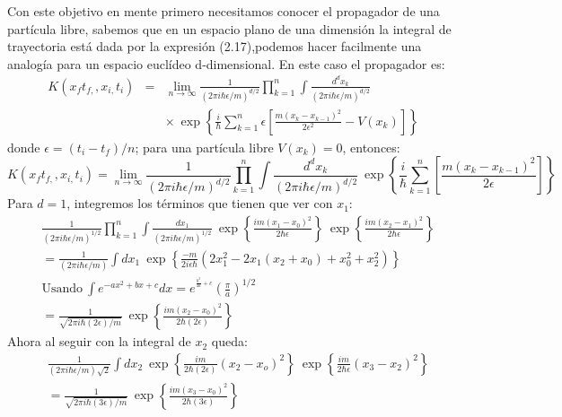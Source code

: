 Con este objetivo en mente primero necesitamos conocer el propagador de una partícula libre, sabemos que en un espacio plano de una dimensión la integral de trayectoria está dada por la expresión (2.17),podemos hacer facilmente una analogía para un espacio euclídeo d-dimensional. En este caso el propagador es:
\begin{eqnarray}
\nonumber K(x_{f}t_{f,},x_{i,}t_{i})&=&\lim_{n\to\infty}\frac{1}{(2\pi i\hbar\epsilon/m)^{d/2}}\prod_{k=1}^{n}\int\frac{d^{d}x_{k}}{(2\pi i\hbar\epsilon/m)^{d/2}}\\
&&\times \ \exp\left\{ \frac{i}{\hbar}\sum_{k=1}^{n}\epsilon\left[\frac{m(x_{k}-x_{k-1})^{2}}{2\epsilon^{2}}-V(x_{k})\right]\right\} 
\end{eqnarray}
donde $\epsilon=(t_i-t_f)/n$; para una partícula libre $V(x_k)=0$, entonces:
\begin{equation}
K(x_{f}t_{f,},x_{i,}t_{i})=\lim_{n\to\infty}\frac{1}{(2\pi i\hbar\epsilon/m)^{d/2}}\prod_{k=1}^{n}\int\frac{d^{d}x_{k}}{(2\pi i\hbar\epsilon/m)^{d/2}}\ \exp\left\{ \frac{i}{\hbar}\sum_{k=1}^{n}\left[\frac{m(x_{k}-x_{k-1})^{2}}{2\epsilon}\right]\right\}
\end{equation}
Para $d=1$, integremos los términos que tienen que ver con $x_1$:
\begin{eqnarray}
\nonumber &\frac{1}{(2\pi i\hbar\epsilon/m)^{1/2}}\prod_{k=1}^{n}\int\frac{dx_{1}}{(2\pi i\hbar\epsilon/m)^{1/2}}\ \exp\left\{ \frac{im(x_{1}-x_{0})^{2}}{2\hbar\epsilon}\right\} \ \exp\left\{ \frac{im(x_{2}-x_{1})^{2}}{2\hbar\epsilon}\right\}\\
\nonumber &=\frac{1}{(2\pi i\hbar\epsilon/m)}\int dx_{1}\ \exp\left\{ \frac{-m}{2i\epsilon\hbar}\left(2x_{1}^{2}-2x_{1}(x_{2}+x_{0})+x_{0}^{2}+x_{2}^{2}\right)\right\}\\
\nonumber &\text{Usando} \ \int e^{-ax^{2}+bx+c}dx=e^{^{\frac{b^{2}}{4a}+c}}\left(\frac{\pi}{a}\right)^{1/2}\\
\nonumber &=\frac{1}{\sqrt{2\pi i\hbar(2\epsilon)/m}}\ \exp\left\{ \frac{im(x_{2}-x_{0})^{2}}{2\hbar(2\epsilon)}\right\} 
\end{eqnarray}
Ahora al seguir con la integral de $x_2$ queda:
\begin{eqnarray}
\nonumber & \frac{1}{(2\pi i\hbar\epsilon/m)\sqrt{2}}\int dx_{2}\ \exp\left\{ \frac{im}{2\hbar(2\epsilon)}\left(x_{2}-x_{o}\right)^{2}\right\} \ \exp\left\{ \frac{im}{2\hbar\epsilon}\left(x_{3}-x_{2}\right)^{2}\right\} \\
&=\frac{1}{\sqrt{2\pi i\hbar(3\epsilon)/m}}\ \exp\left\{ \frac{im(x_{3}-x_{0})^{2}}{2\hbar(3\epsilon)}\right\} 
\end{eqnarray}

